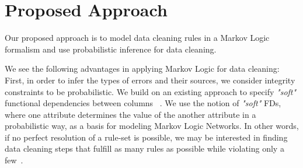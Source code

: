 
\section{Proposed Approach}
\label{sec:method}



Our proposed approach is to model data cleaning rules in a Markov Logic~\cite{domingos2009markov} formalism and use probabilistic inference 
for data cleaning. 

We see the following advantages in applying Markov Logic for data cleaning: First, in order to infer the types of errors and their sources, we consider integrity constraints to be probabilistic. We build on an existing approach to specify \textit{"soft"} functional dependencies between columns~\cite{Ilyas:2004:CAD:1007568.1007641} .  We use the notion of \textit{"soft"} FDs, where one attribute determines the value of the another attribute in a probabilistic way, as a basis for modeling Markov Logic Networks. In other words, if no perfect resolution of a rule-set is possible, we may be interested in finding data cleaning steps that fulfill as many rules as possible while violating only a few~\cite{genesereth1987logical}. 

